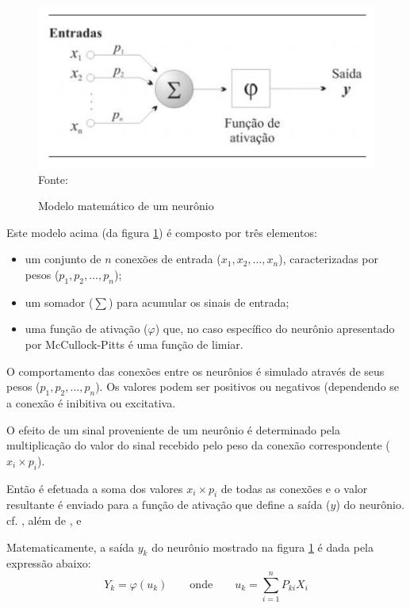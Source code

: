 \begin{figure}[h!]
	\centering
	\includegraphics[width=.7\textwidth]{imagens/modelo_matematico_neuronio.png}
	{\scriptsize Fonte:\cite[p. 36]{haykin_redes_2001}}
	\caption{Modelo matemático de um neurônio}
	\label{fig:neuronio}
\end{figure}

Este modelo acima (da figura \ref{fig:neuronio}) é composto por três elementos:

\begin{itemize}
	\item  um conjunto de $ n $ conexões de entrada ($ x_1, x_2, \dots , x_n $), caracterizadas por pesos ($ p_1, p_2, \dots, p_n $);
	\item um somador ($ \sum $) para acumular os sinais de entrada;
	\item uma função de ativação ($\varphi$) que, no caso específico do neurônio apresentado por McCullock-Pitts \cite{mcculloch_logical_1943} é uma função de limiar. \cite{ferneda_redes_2006} \cite{lima_ia_2016}
\end{itemize}

O comportamento das conexões entre os neurônios é simulado através de seus pesos  ($ p_1, p_2, ..., p_n $). Os valores podem ser positivos ou negativos (dependendo se a conexão é inibitiva ou excitativa. 

O efeito de um sinal proveniente de um neurônio é determinado pela multiplicação do valor do sinal recebido pelo peso da conexão correspondente ($x_i \times p_i$).

Então é efetuada a soma dos valores $x_i \times p_i$ de todas as conexões e o valor resultante é enviado para a função de ativação que define a saída ($y$) do neurônio. cf. \cite{Norvig2013} \cite{mcculloch_logical_1943}, além de \cite{minsky_perceptrons:_1969}, \cite{ferneda_redes_2006} e \cite{haykin_redes_2001}

Matematicamente, a saída $y_k$ do neurônio mostrado na figura \ref{fig:neuronio} é dada pela expressão abaixo:
\begin{equation}
	Y_k = \varphi(u_k) \qquad \text{onde} \qquad u_k = \sum_{i=1}^{n} P_{ki}X_i 
\end{equation}

